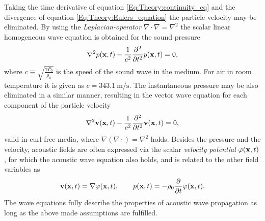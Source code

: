 %
%
Taking the time derivative of equation \ref{Eq:Theory:continuity_eq} and the divergence of equation \ref{Eq:Theory:Eulers_equation} the particle velocity may be eliminated. By using the \emph{Laplacian-operator} $\nabla \cdot \nabla = \nabla^2$ the scalar linear homogeneous wave equation is obtained for the sound pressure
\begin{equation}
\nabla^2 p(\mathbf{x},t) - \frac{1}{c^2} \frac{\partial^2}{\partial t^2} p(\mathbf{x},t) = 0,
\label{Eq:Theory:Scalar_wave_equation}
\end{equation}
%
%
where $c \equiv \sqrt{ \frac{\gamma P_0}{\rho_0} }$ is the speed of the sound wave in the medium. 
For air in room temperature it is given as $c = 343.1 ~ \mathrm{m}/\mathrm{s}$.
The instantaneous pressure may be also eliminated in a similar manner, resulting in the vector wave equation for each component of the particle velocity
\begin{equation}
\nabla^2 \mathbf{v}(\mathbf{x},t) - \frac{1}{c^2} \frac{\partial^2}{\partial t^2} \mathbf{v}(\mathbf{x},t) = 0,
\label{Eq:Theory:Vector_wave_equation}
\end{equation}
valid in curl-free media, where $\nabla \left( \nabla \cdot \right) = \nabla^2$ holds.
%
Besides the pressure and the velocity, acoustic fields are often expressed via the scalar \emph{velocity potential} $\varphi(\mathbf{x},t)$, for which the acoustic wave equation also holds, and is related to the other field variables as 
\begin{equation}
\mathbf{v}(\mathbf{x},t) = \nabla \varphi(\mathbf{x},t), \hspace{7mm} p(\mathbf{x},t) = -\rho_0 \frac{\partial}{\partial t} \varphi(\mathbf{x},t).
\label{eq:theory:velocity_potential_definition}
\end{equation}
%
The wave equations fully describe the properties of acoustic wave propagation as long as the above made assumptions are fulfilled.


